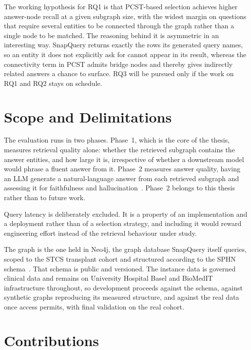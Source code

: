 The working hypothesis for RQ1 is that PCST-based selection achieves higher
answer-node recall at a given subgraph size, with the widest margin on questions
that require several entities to be connected through the graph rather than a
single node to be matched. The reasoning behind it is asymmetric in an
interesting way. SnapQuery returns exactly the rows its generated query names, so
an entity it does not explicitly ask for cannot appear in its result, whereas the
connectivity term in PCST admits bridge nodes and thereby gives indirectly
related answers a chance to surface. RQ3 will be pursued only if the work on RQ1
and RQ2 stays on schedule.

\section{Scope and Delimitations} \label{sec:thesis-scope}

The evaluation runs in two phases. Phase~1, which is the core of the thesis,
measures retrieval quality alone: whether the retrieved subgraph contains the
answer entities, and how large it is, irrespective of whether a downstream model
would phrase a fluent answer from it. Phase~2 measures answer quality, having an
LLM generate a natural-language answer from each retrieved subgraph and assessing
it for faithfulness and hallucination~\cite{huang2023hallucination}. Phase~2
belongs to this thesis rather than to future work.

Query latency is deliberately excluded. It is a property of an implementation and
a deployment rather than of a selection strategy, and including it would reward
engineering effort instead of the retrieval behaviour under study.

The graph is the one held in Neo4j, the graph database SnapQuery itself
queries, scoped to the STCS transplant cohort and structured according to the
SPHN schema~\cite{sphnschema}. That schema is public and versioned. The
instance data is governed clinical data and remains on University Hospital
Basel and BioMedIT infrastructure throughout, so development proceeds against
the schema, against synthetic graphs reproducing its measured structure, and
against the real data once access permits, with final validation on the real
cohort.

\section{Contributions} \label{sec:contributions}

